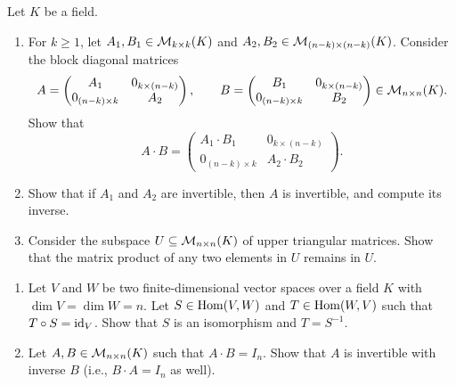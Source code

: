 \begin{exercise}
\label{exc:block_diagonal_upper_triangular_mult}
Let $K$ be a field.
\begin{enumerate}
    \item For $k \ge 1$, let $A_1, B_1 \in \mathcal{M}_{k \times k}(K)$ and $A_2, B_2 \in \mathcal{M}_{(n-k) \times (n-k)}(K)$. Consider the block diagonal matrices
    \[
    A = \begin{pmatrix} A_1 & 0_{k \times (n-k)} \\ 0_{(n-k) \times k} & A_2 \end{pmatrix}, \qquad
    B = \begin{pmatrix} B_1 & 0_{k \times (n-k)} \\ 0_{(n-k) \times k} & B_2 \end{pmatrix} \in \mathcal{M}_{n \times n}(K).
    \]
    Show that
    \[
    A \cdot B = \begin{pmatrix} A_1 \cdot B_1 & 0_{k \times (n-k)} \\ 0_{(n-k) \times k} & A_2 \cdot B_2 \end{pmatrix}.
    \]
    \item Show that if $A_1$ and $A_2$ are invertible, then $A$ is invertible, and compute its inverse.
    \item Consider the subspace $U \subseteq \mathcal{M}_{n \times n}(K)$ of upper triangular matrices. Show that the matrix product of any two elements in $U$ remains in $U$.
\end{enumerate}
\end{exercise}

\begin{exercise}
\label{exc:one_sided_inverse_finite_dim}
\begin{enumerate}
    \item Let $V$ and $W$ be two finite-dimensional vector spaces over a field $K$ with $\dim V = \dim W = n$. Let $S \in \operatorname{Hom}(V, W)$ and $T \in \operatorname{Hom}(W, V)$ such that $T \circ S = \operatorname{id}_V$. Show that $S$ is an isomorphism and $T = S^{-1}$.
    \item Let $A, B \in \mathcal{M}_{n \times n}(K)$ such that $A \cdot B = I_n$. Show that $A$ is invertible with inverse $B$ (i.e., $B \cdot A = I_n$ as well).
\end{enumerate}
\end{exercise}

